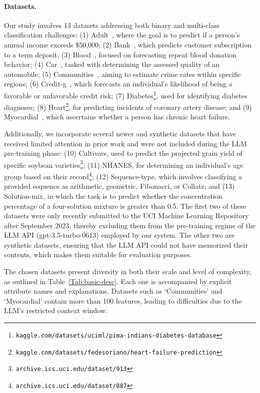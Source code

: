 \paragraph{Datasets.}
Our study involves 13 datasets addressing both binary and multi-class classification challenges: (1) Adult~\cite{asuncion2007uci}, where the goal is to predict if a person's annual income exceeds \$50,000; (2) Bank~\cite{moro2014data}, which predicts customer subscription to a term deposit; (3) Blood~\cite{yeh2009knowledge}, focused on forecasting repeat blood donation behavior; (4) Car~\cite{kadra2021well}, tasked with determining the assessed quality of an automobile; (5) Communities~\cite{misc_communities_and_crime_183}, aiming to estimate crime rates within specific regions; (6) Credit-g~\cite{kadra2021well}, which forecasts an individual’s likelihood of being a favorable or unfavorable credit risk; (7) Diabetes\footnote{\texttt{kaggle.com/datasets/uciml/pima-indians-diabetes-database}}, used for identifying diabetes diagnoses; (8) Heart\footnote{\texttt{kaggle.com/datasets/fedesoriano/heart-failure-prediction}}, for predicting incidents of coronary artery disease; and (9) Myocardial~\cite{misc_myocardial_infarction_complications_579}, which ascertains whether a person has chronic heart failure.

Additionally, we incorporate several newer and synthetic datasets that have received limited attention in prior work and were not included during the LLM pre-training phase: (10) Cultivars, used to predict the projected grain yield of specific soybean varieties\footnote{\texttt{archive.ics.uci.edu/dataset/913}}; (11) NHANES, for determining an individual's age group based on their record\footnote{\texttt{archive.ics.uci.edu/dataset/887}}; (12) Sequence-type, which involves classifying a provided sequence as arithmetic, geometric, Fibonacci, or Collatz; and (13) Solution-mix, in which the task is to predict whether the concentration percentage of a four-solution mixture is greater than 0.5. The first two of these datasets were only recently submitted to the UCI Machine Learning Repository after September 2023, thereby excluding them from the pre-training regime of the LLM API (gpt-3.5-turbo-0613) employed by our system. The other two are synthetic datasets, ensuring that the LLM API could not have memorized their contents, which makes them suitable for evaluation purposes.

The chosen datasets present diversity in both their scale and level of complexity, as outlined in Table~\ref{Tab:basic-desc}. Each one is accompanied by explicit attribute names and explanations. Datasets such as `Communities' and `Myocardial' contain more than 100 features, leading to difficulties due to the LLM’s restricted context window.

